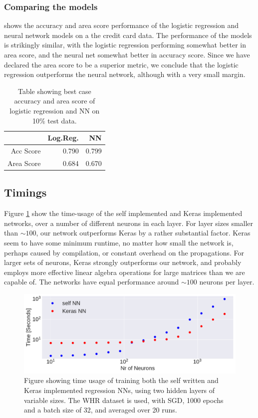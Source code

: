 \documentclass[10pt, twocolumn]{article}
\begin{document}
\subsubsection{Comparing the models}
 shows the accuracy and area score performance of the logistic regression and neural network models on a the credit card data. The performance of the models is strikingly similar, with the logistic regression performing somewhat better in area score, and the neural net somewhat better in accuracy score. Since we have declared the area score to be a superior metric, we conclude that the logistic regression outperforms the neural network, although with a very small margin.
\begin{table}[H]
    \centering
    \begin{tabular}{r r r}
                 & Log.Reg. &  NN \\
                 \hline
    Acc Score     & 0.790  &  0.799 \\
                 \hline
    Area Score    & 0.684  &  0.670
    \end{tabular}
    \caption{Table showing best case accuracy and area score of logistic regression and NN on 10\% test data.}
    \label{tab:CC_comparison}
\end{table}

\subsection{Timings}
Figure \ref{fig:timings} show the time-usage of the self implemented and Keras implemented networks, over a number of different neurons in each layer. For layer sizes smaller than $\sim100$, our network outperforms Keras by a rather substantial factor. Keras seem to have some minimum runtime, no matter how small the network is, perhaps caused by compilation, or constant overhead on the propagations. For larger sets of neurons, Keras strongly outperforms our network, and probably employs more effective linear algebra operations for large matrices than we are capable of. The networks have equal performance around $\sim100$ neurons per layer.
\begin{figure}[H]
    \centering
    \includegraphics[scale=0.38]{../figs/timings.pdf}
    \caption{Figure showing time usage of training both the self written and Keras implemented regression NNs, using two hidden layers of variable sizes. The WHR dataset is used, with SGD, 1000 epochs and a batch size of 32, and averaged over 20 runs.}
    \label{fig:timings}
\end{figure}
\end{document}
